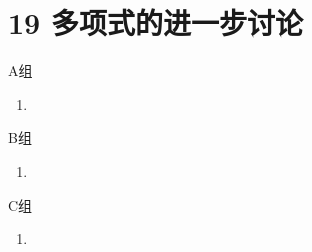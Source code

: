 \section*{19 多项式的进一步讨论}

\vspace{2ex}

\centerline{\heiti A组}
\begin{enumerate}
    \item
\end{enumerate}

\centerline{\heiti B组}
\begin{enumerate}
    \item
\end{enumerate}

\centerline{\heiti C组}
\begin{enumerate}
    \item
\end{enumerate}

\clearpage
